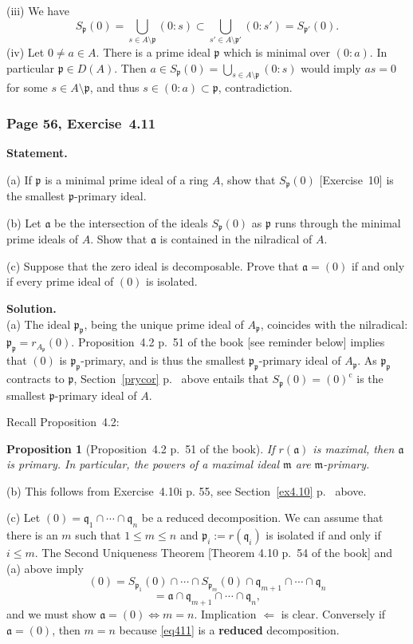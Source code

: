 \documentclass[12pt,letterpaper]{article}%
\newcommand{\oo}{\operatorname}\newcommand{\ooo}{\operatorname*}
\newcommand{\mf}{\mathfrak}
\newcommand{\aaa}{\mf a}
\newcommand{\mmm}{\mf m}
\newcommand{\ppp}{\mf p}
\newcommand{\qqq}{\mf q}
\newcommand{\nn}{\noindent}
\newtheorem{prop}[thm]{Proposition}
\begin{document}
\nn(iii) We have 
$$
S_\ppp(0)=\bigcup_{s\in A\setminus\ppp}(0:s)\subset\bigcup_{s'\in A\setminus\ppp'}(0:s')=S_{\ppp'}(0).
$$
\nn(iv) Let $0\ne a\in A$. There is a prime ideal $\ppp$ which is minimal over $(0:a)$. In particular $\ppp\in D(A)$. Then 
$
a\in S_\ppp(0)=\bigcup_{s\in A\setminus\ppp}(0:s)
$ 
would imply $as=0$ for some $s\in A\setminus\ppp$, and thus $s\in(0:a)\subset\ppp$, contradiction.

\subsubsection{Page 56, Exercise~4.11}\label{ex4.11}%

\textbf{Statement.} 

\nn(a) If $\ppp$ is a minimal prime ideal of a ring $A$, show that $S_\ppp(0)$ [Exercise~10] is the smallest $\ppp$-primary ideal. 

\nn(b) Let $\aaa$ be the intersection of the ideals $S_\ppp(0)$ as  $\ppp$ runs through the minimal prime ideals of $A$. Show that $\aaa$ is contained in the nilradical of $A$.

\nn(c) Suppose that the zero ideal is decomposable. Prove that $\aaa=(0)$ if and only if every prime ideal of $(0)$ is isolated.

\nn\textbf{Solution.}\\ (a) The ideal $\ppp_\ppp$, being the unique prime ideal of $A_\ppp$, coincides with the nilradical: $\ppp_\ppp=r_{A_\ppp}(0)$. Proposition~4.2 p.~51 of the book [see reminder below] implies that $(0)$ is $\ppp_\ppp$-primary, and is thus the smallest $\ppp_\ppp$-primary ideal of $A_\ppp$. As $\ppp_\ppp$ contracts to $\ppp$, Section~\ref{prycor} p.~\pageref{prycor} above entails that $S_\ppp(0)=(0)^{\oo c}$ is the smallest $\ppp$-primary ideal of $A$.

Recall Proposition~4.2:

\begin{prop}[Proposition~4.2 p.~51 of the book]\label{p4.2}
If $r(\aaa)$ is maximal, then $\aaa$ is primary. In particular, the powers of a maximal ideal $\mmm$ are $\mmm$-primary.
\end{prop}

\nn(b) This follows from Exercise~4.10i p. 55, see Section~\ref{ex4.10} p.~\pageref{ex4.10} above.

\nn(c) Let $(0)=\qqq_1\cap\cdots\cap\qqq_n$ be a reduced decomposition. We can assume that there is an $m$ such that $1\le m\le n$ and $\ppp_i:=r(\qqq_i)$ is isolated if and only if $i\le m$. The Second Uniqueness Theorem [Theorem 4.10 p.~54 of the book] and (a) above imply 
\begin{equation}\label{eq411}
(0)=S_{\ppp_1}(0)\cap\cdots\cap S_{\ppp_m}(0)\cap\qqq_{m+1}\cap\cdots\cap\qqq_n
\end{equation} 
$$
=\aaa\cap\qqq_{m+1}\cap\cdots\cap\qqq_n,
$$ 
and we must show $\aaa=(0)\iff m=n$. Implication $\Longleftarrow$ is clear. Conversely if $\aaa=(0)$, then $m=n$ because \eqref{eq411} is a \textbf{reduced} decomposition.
\end{document}
